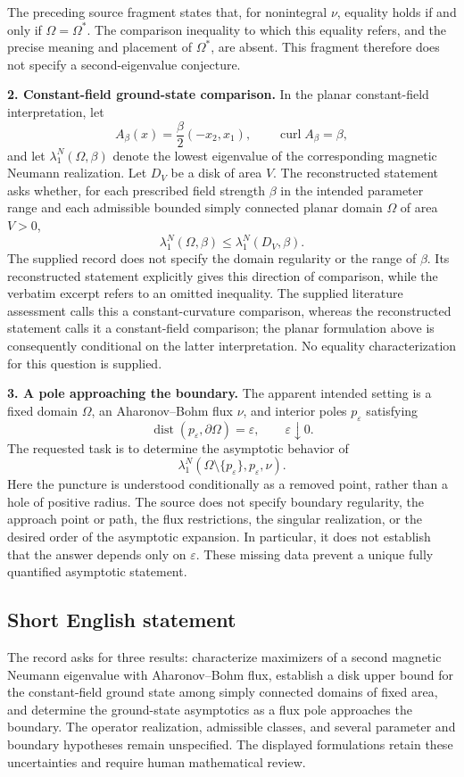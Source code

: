\documentclass[11pt]{article}
\begin{document}
The preceding source fragment states that, for nonintegral \(\nu\), equality holds if and only if \(\Omega=\Omega^*\). The comparison inequality to which this equality refers, and the precise meaning and placement of \(\Omega^*\), are absent. This fragment therefore does not specify a second-eigenvalue conjecture.

\textbf{2. Constant-field ground-state comparison.}
In the planar constant-field interpretation, let
\[
A_\beta(x)=\frac{\beta}{2}(-x_2,x_1),\qquad \operatorname{curl}A_\beta=\beta,
\]
and let \(\lambda_1^N(\Omega,\beta)\) denote the lowest eigenvalue of the corresponding magnetic Neumann realization. Let \(D_V\) be a disk of area \(V\). The reconstructed statement asks whether, for each prescribed field strength \(\beta\) in the intended parameter range and each admissible bounded simply connected planar domain \(\Omega\) of area \(V>0\),
\[
\lambda_1^N(\Omega,\beta)\leq\lambda_1^N(D_V,\beta).
\]
The supplied record does not specify the domain regularity or the range of \(\beta\). Its reconstructed statement explicitly gives this direction of comparison, while the verbatim excerpt refers to an omitted inequality. The supplied literature assessment calls this a constant-curvature comparison, whereas the reconstructed statement calls it a constant-field comparison; the planar formulation above is consequently conditional on the latter interpretation. No equality characterization for this question is supplied.

\textbf{3. A pole approaching the boundary.}
The apparent intended setting is a fixed domain \(\Omega\), an Aharonov--Bohm flux \(\nu\), and interior poles \(p_\varepsilon\) satisfying
\[
\operatorname{dist}(p_\varepsilon,\partial\Omega)=\varepsilon,\qquad \varepsilon\downarrow0.
\]
The requested task is to determine the asymptotic behavior of
\[
\lambda_1^N(\Omega\setminus\{p_\varepsilon\},p_\varepsilon,\nu).
\]
Here the puncture is understood conditionally as a removed point, rather than a hole of positive radius. The source does not specify boundary regularity, the approach point or path, the flux restrictions, the singular realization, or the desired order of the asymptotic expansion. In particular, it does not establish that the answer depends only on \(\varepsilon\). These missing data prevent a unique fully quantified asymptotic statement.
\subsection{Short English statement}
The record asks for three results: characterize maximizers of a second magnetic Neumann eigenvalue with Aharonov--Bohm flux, establish a disk upper bound for the constant-field ground state among simply connected domains of fixed area, and determine the ground-state asymptotics as a flux pole approaches the boundary. The operator realization, admissible classes, and several parameter and boundary hypotheses remain unspecified. The displayed formulations retain these uncertainties and require human mathematical review.
\end{document}

